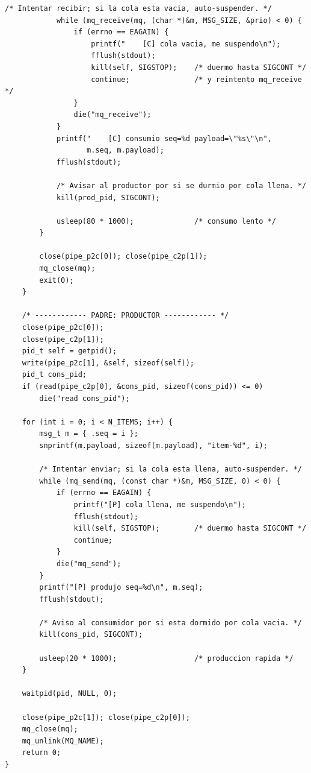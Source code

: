 \documentclass[11pt,a4paper]{article}
\begin{document}
\begin{lstlisting}[style=cstyle]
            /* Intentar recibir; si la cola esta vacia, auto-suspender. */
            while (mq_receive(mq, (char *)&m, MSG_SIZE, &prio) < 0) {
                if (errno == EAGAIN) {
                    printf("    [C] cola vacia, me suspendo\n");
                    fflush(stdout);
                    kill(self, SIGSTOP);    /* duermo hasta SIGCONT */
                    continue;               /* y reintento mq_receive */
                }
                die("mq_receive");
            }
            printf("    [C] consumio seq=%d payload=\"%s\"\n",
                   m.seq, m.payload);
            fflush(stdout);

            /* Avisar al productor por si se durmio por cola llena. */
            kill(prod_pid, SIGCONT);

            usleep(80 * 1000);              /* consumo lento */
        }

        close(pipe_p2c[0]); close(pipe_c2p[1]);
        mq_close(mq);
        exit(0);
    }

    /* ------------ PADRE: PRODUCTOR ------------ */
    close(pipe_p2c[0]);
    close(pipe_c2p[1]);
    pid_t self = getpid();
    write(pipe_p2c[1], &self, sizeof(self));
    pid_t cons_pid;
    if (read(pipe_c2p[0], &cons_pid, sizeof(cons_pid)) <= 0)
        die("read cons_pid");

    for (int i = 0; i < N_ITEMS; i++) {
        msg_t m = { .seq = i };
        snprintf(m.payload, sizeof(m.payload), "item-%d", i);

        /* Intentar enviar; si la cola esta llena, auto-suspender. */
        while (mq_send(mq, (const char *)&m, MSG_SIZE, 0) < 0) {
            if (errno == EAGAIN) {
                printf("[P] cola llena, me suspendo\n");
                fflush(stdout);
                kill(self, SIGSTOP);        /* duermo hasta SIGCONT */
                continue;
            }
            die("mq_send");
        }
        printf("[P] produjo seq=%d\n", m.seq);
        fflush(stdout);

        /* Aviso al consumidor por si esta dormido por cola vacia. */
        kill(cons_pid, SIGCONT);

        usleep(20 * 1000);                  /* produccion rapida */
    }

    waitpid(pid, NULL, 0);

    close(pipe_p2c[1]); close(pipe_c2p[0]);
    mq_close(mq);
    mq_unlink(MQ_NAME);
    return 0;
}
\end{lstlisting}
\end{document}
